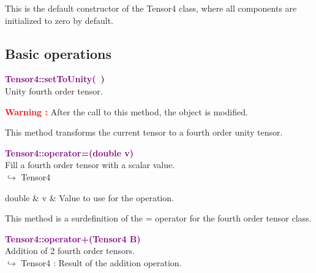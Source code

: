 This is the default constructor of the Tensor4 class, where all components are initialized to zero by default.

\subsection{Basic operations}

\textcolor{purple}{\textbf{Tensor4::setToUnity(~)}}\label{Tensor4::setToUnity()}\\
Unity fourth order tensor.

\hspace*{10mm}\textcolor{red}{\textbf{Warning :}} After the call to this method, the object is modified.

This method transforms the current tensor to a fourth order unity tensor.

\textcolor{purple}{\textbf{Tensor4::operator=(double v)}}\label{Tensor4::operator=(double v)}\\
Fill a fourth order tensor with a scalar value.\\ \hspace*{10mm}$\hookrightarrow$ Tensor4

\begin{tcolorbox}[width=\textwidth,myArgs,tabularx={ll|R}]
double & v & Value to use for the operation.
\end{tcolorbox}

This method is a surdefinition of the = operator for the fourth order tensor class.

\textcolor{purple}{\textbf{Tensor4::operator+(Tensor4 B)}}\label{Tensor4::operator+(Tensor4 B)}\\
Addition of 2 fourth order tensors.\\ \hspace*{10mm}$\hookrightarrow$ Tensor4 : Result of the addition operation.

